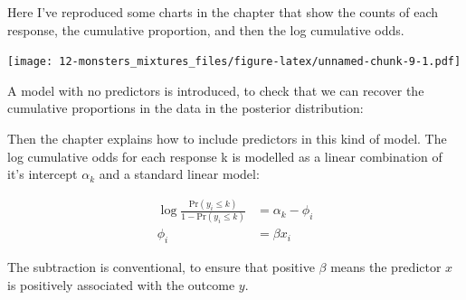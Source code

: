 \documentclass[
]{book}
\newenvironment{Shaded}{\begin{snugshade}}{\end{snugshade}}
\newcommand{\AttributeTok}[1]{\textcolor[rgb]{0.77,0.63,0.00}{#1}}
\newcommand{\CommentTok}[1]{\textcolor[rgb]{0.56,0.35,0.01}{\textit{#1}}}
\newcommand{\ConstantTok}[1]{\textcolor[rgb]{0.00,0.00,0.00}{#1}}
\newcommand{\DecValTok}[1]{\textcolor[rgb]{0.00,0.00,0.81}{#1}}
\newcommand{\FloatTok}[1]{\textcolor[rgb]{0.00,0.00,0.81}{#1}}
\newcommand{\FunctionTok}[1]{\textcolor[rgb]{0.00,0.00,0.00}{#1}}
\newcommand{\NormalTok}[1]{#1}
\newcommand{\OtherTok}[1]{\textcolor[rgb]{0.56,0.35,0.01}{#1}}
\newcommand{\SpecialCharTok}[1]{\textcolor[rgb]{0.00,0.00,0.00}{#1}}
\begin{document}
Here I've reproduced some charts in the chapter that show the counts of each response, the cumulative proportion, and then the log cumulative odds.

\texttt{[image: 12-monsters\_mixtures\_files/figure-latex/unnamed-chunk-9-1.pdf]}

A model with no predictors is introduced, to check that we can recover the cumulative proportions in the data in the posterior distribution:

\begin{Shaded}
\end{Shaded}

Then the chapter explains how to include predictors in this kind of model. The log cumulative odds for each response k is modelled as a linear combination of it's intercept \(\alpha_k\) and a standard linear model:

\[
\begin{aligned}
\log\frac{\text{Pr}(y_i \leq k)}{1 - \text{Pr}(y_i \leq k)} &= \alpha_k - \phi_i \\
\phi_i & = \beta x_i
\end{aligned}
\]

The subtraction is conventional, to ensure that positive \(\beta\) means the predictor \(x\) is positively associated with the outcome \(y\).
\end{document}
